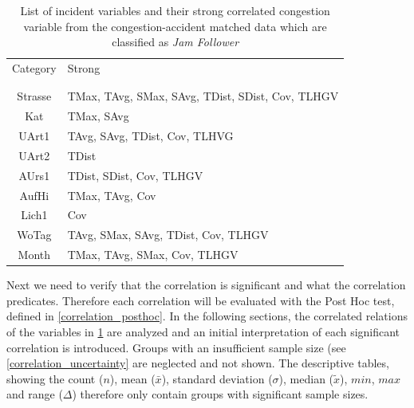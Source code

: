 \begin{table}[h!]
	\centering
	\begin{tabular}{c|l}  
		Category & Strong \\
		\\[-1em]
		\hline
		\\[-1em]
		Strasse & TMax, TAvg, SMax, SAvg, TDist, SDist, Cov, TLHGV \\ 
 		Kat & TMax, SAvg \\ %
 		UArt1 & TAvg, SAvg, TDist, Cov, TLHVG \\ %
 		UArt2 & TDist \\ %
 		AUrs1 & TDist, SDist, Cov, TLHGV \\ %
 		AufHi & TMax, TAvg, Cov \\ %
 		Lich1 & Cov \\ %
 		WoTag & TAvg, SMax, SAvg, TDist, Cov, TLHGV \\ %
 		Month & TMax, TAvg, SMax, Cov, TLHGV \\ %
	\end{tabular}
    \caption{List of incident variables and their strong correlated congestion variable from the congestion-accident matched data which are classified as \textit{Jam Follower}}
	\label{tbl:correlation_list_baysis_follower}
\end{table}
Next we need to verify that the correlation is significant and what the correlation predicates. Therefore each correlation will be evaluated with the Post Hoc test, defined in \cref{correlation_posthoc}. In the following sections, the correlated relations of the variables in \cref{tbl:correlation_list_baysis_follower} are analyzed and an initial interpretation of each significant correlation is introduced. Groups with an insufficient sample size (see \cref{correlation_uncertainty} are neglected and not shown. The descriptive tables, showing the count ($n$), mean ($\bar{x}$), standard deviation ($\sigma$), median ($\tilde{x}$), $min$, $max$ and range ($\Delta$) therefore only contain groups with significant sample sizes.
